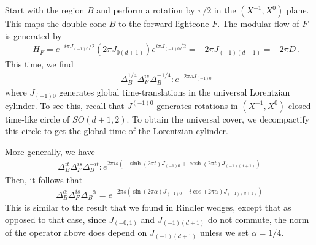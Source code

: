\documentclass[a4paper,11pt]{article}
\theoremstyle{definition}
\begin{document}
Start with the region $B$ and perform a rotation by $\pi/2$ in the $(X^{-1},X^{0})$ plane. This maps the double cone $B$ to the forward lightcone $F$. The modular flow of $F$ is generated by 
\begin{eqnarray}
  &&  H_F=e^{-i \pi J_{(-1)0}/2}(2\pi J_{0(d+1)})e^{i \pi J_{(-1)0}/2}=-2\pi J_{(-1)(d+1)}=-2\pi D\ .
\end{eqnarray}
This time, we find
\begin{eqnarray}\label{identityCFT}
    &&\Delta_B^{1/4}\Delta_F^{is}\Delta_B^{-1/4}:e^{-2\pi s J_{(-1)0}}
\end{eqnarray}
where $J_{(-1)0}$ generates global time-translations in the universal Lorentzian cylinder. To see this, recall that $J^{(-1)0}$ generates rotations in $(X^{-1},X^0)$ closed time-like circle of $SO(d+1,2)$. To obtain the universal cover, we decompactify this circle to get the global time of the Lorentzian cylinder.

More generally, we have 
\begin{eqnarray}
    \Delta_B^{it}\Delta_F^{is}\Delta_B^{-it}:e^{2\pi i s(-\sinh(2\pi t)J_{(-1)0}+\cosh(2\pi t)J_{(-1)(d+1)})}
\end{eqnarray}
Then, it follows that 
\begin{eqnarray}
    \Delta_B^{\alpha}\Delta_F^{is}\Delta_B^{-\alpha}=e^{-2\pi s(\sin(2\pi \alpha)J_{(-1)0}-i\cos(2\pi \alpha)J_{(-1)(d+1)})}
\end{eqnarray}
This is similar to the result that we found in Rindler wedges, except that as opposed to that case, since $J_{(-0,1)}$ and $J_{(-1)(d+1)}$ do not commute, the norm of the operator above does depend on $J_{(-1)(d+1)}$ unless we set $\alpha=1/4$.
\end{document}
